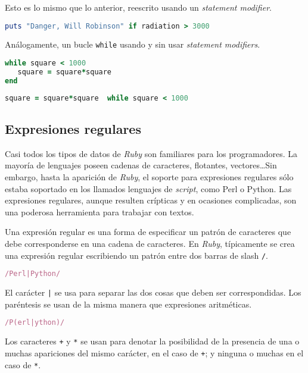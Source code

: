 Esto es lo mismo que lo anterior, reescrito usando un \textit{statement modifier}.

\begin{lstlisting}[language=Ruby]
puts "Danger, Will Robinson" if radiation > 3000
\end{lstlisting}

Análogamente, un bucle \texttt{while} usando y sin usar \textit{statement modifiers}.

\begin{lstlisting}[language=Ruby]
while square < 1000
   square = square*square
end
\end{lstlisting}

\begin{lstlisting}[language=Ruby]
square = square*square  while square < 1000
\end{lstlisting}

\subsection{Expresiones regulares}
Casi todos los tipos de datos de \textit{Ruby} son familiares para los programadores. La mayoría de lenguajes poseen cadenas de caracteres, flotantes, vectores\ldots Sin embargo, hasta la aparición de \textit{Ruby}, el soporte para expresiones regulares sólo estaba soportado en los llamados lenguajes de \textit{script}, como Perl o Python. Las expresiones regulares, aunque resulten crípticas y en ocasiones complicadas, son una poderosa herramienta para trabajar con textos.

Una expresión regular es una forma de especificar un patrón de caracteres que debe corresponderse en una cadena de caracteres. En \textit{Ruby}, típicamente se crea una expresión regular escribiendo un patrón entre dos barras de slash \texttt{/}.

\begin{lstlisting}[language=Ruby]
/Perl|Python/
\end{lstlisting}

El carácter \texttt{|} se usa para separar las dos cosas que deben ser correspondidas. Los paréntesis se usan de la misma manera que expresiones aritméticas.
\begin{lstlisting}[language=Ruby]
/P(erl|ython)/
\end{lstlisting}

Los caracteres \texttt{+} y \texttt{*} se usan para denotar la posibilidad de la presencia  de una o muchas apariciones del mismo carácter, en el caso de \texttt{+}; y ninguna o muchas en el caso de \texttt{*}.

